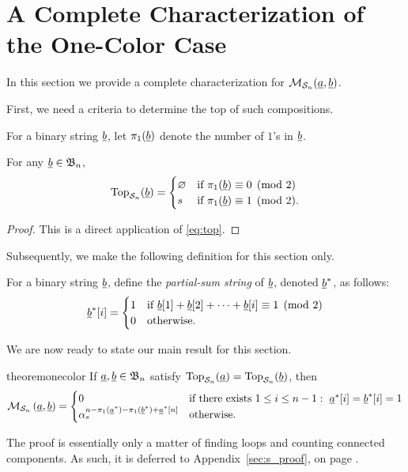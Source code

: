 \section{A Complete Characterization of the One-Color Case}
\label{sec:res_onecolor}
In this section we provide a complete characterization for $\mathcal M_{\mathcal S_n}(\underline{a}, \underline{b})$.  %

First, we need a criteria to determine the top of such compositions.
\begin{definition}
	For a binary string $\underline{b}$, let $\pi_1(\underline{b})$ denote the number of $1$'s in $\underline{b}$.
\end{definition}
\begin{proposition}
	For any $\underline{b} \in \mathfrak B_n$, \[
		\operatorname{Top}_{\mathcal S_n}(\underline{b}) =
		\begin{cases}
			\varnothing & \text{if } \pi_1(\underline{b}) \equiv 0 \pmod{2} \\
			s & \text{if } \pi_1(\underline{b}) \equiv 1 \pmod{2}.
		\end{cases}
		\]
	\label{prop:s_top}
\end{proposition}
\begin{proof}
	This is a direct application of \eqref{eq:top}.
\end{proof}

Subsequently, we make the following definition for this section only.
\begin{definition}
	For a binary string $\underline{b}$, define the \emph{partial-sum string} of $\underline{b}$, denoted $\underline{b}^\ast$, as follows:
	\[
		\underline{b}^\ast [i] = 
		\begin{cases}
			1 & \text{if } \underline{b}[1] + \underline{b}[2] + \dots + \underline{b}[i] \equiv 1 \pmod{2} \\
			0 & \text{otherwise}.
		\end{cases}
	\]
\end{definition}
We are now ready to state our main result for this section. 
\begin{restatable}{theorem}{onecolor}
	If $\underline{a}, \underline{b} \in \mathfrak B_n$ satisfy $\operatorname{Top}_{\mathcal S_n}(\underline{a}) = \operatorname{Top}_{\mathcal S_n}(\underline{b})$, then
	\[
		\mathcal M_{\mathcal S_n} \left( \underline{a}, \underline{b} \right)
		=
		\begin{cases}
			0 & \text{if there exists } 1 \le i \le n-1:\ \underline{a}^\ast[i] = \underline{b}^\ast[i] = 1 \\
			\alpha_s^{n - \pi_1(\underline{a}^\ast) - \pi_1(\underline{b}^\ast) + \underline{a}^\ast[n]} & \text{otherwise}.
		\end{cases}
	\]
	\label{thm:onecolor}
\end{restatable}
The proof is essentially only a matter of finding loops and counting connected components.
As such, it is deferred to Appendix~\ref{sec:s_proof}, on page \pageref{sec:s_proof}.

